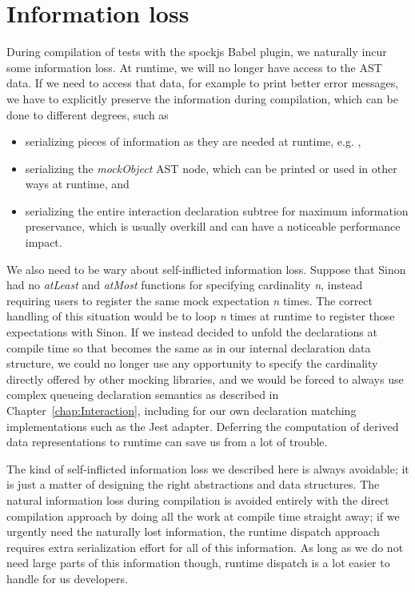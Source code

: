 \section{Information loss}
During compilation of tests with the spockjs Babel plugin,
we naturally incur some information loss.
At runtime, we will no longer have access to the AST data.
If we need to access that data,
for example to print better error messages,
we have to explicitly preserve the information during compilation,
which can be done to different degrees, such as
\begin{itemize}
  \item serializing pieces of information
    as they are needed at runtime, e.g.
    ,
  \item serializing the \textit{mockObject} AST node,
    which can be printed or used in other ways at runtime, and
  \item serializing the entire interaction declaration subtree
    for maximum information preservance,
    which is usually overkill and can have
    a noticeable performance impact.
\end{itemize}

We also need to be wary about self-inflicted information loss.
Suppose that Sinon had no
\textit{atLeast} and \textit{atMost} functions
for specifying cardinality \textit{n},
instead requiring users to
register the same mock expectation \textit{n} times.
The correct handling of this situation would be
to loop \textit{n} times at runtime
to register those expectations with Sinon.
If we instead decided to unfold the declarations at compile time so that
 becomes the same as 
in our internal declaration data structure,
we could no longer use any opportunity
to specify the cardinality directly
offered by other mocking libraries,
and we would be forced to always use complex queueing declaration semantics
as described in Chapter~\ref{chap:Interaction},
including for our own declaration matching implementations
such as the Jest adapter.
Deferring the computation of derived data representations to runtime
can save us from a lot of trouble.

The kind of self-inflicted information loss we described here is always avoidable;
it is just a matter of designing the right abstractions and data structures.
The natural information loss during compilation
is avoided entirely with the direct compilation approach
by doing all the work at compile time straight away;
if we urgently need the naturally lost information,
the runtime dispatch approach requires
extra serialization effort for all of this information.
As long as we do not need large parts of this information though,
runtime dispatch is a lot easier to handle for us developers.

